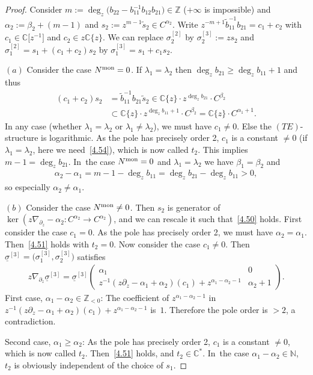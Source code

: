 \documentclass[10pt,a4paper]{amsart}
\numberwithin{equation}{section}
\numberwithin{figure}{section}
\newcommand{\N}{{\mathbb N}}
\newcommand{\Z}{{\mathbb Z}}
\newcommand{\C}{{\mathbb C}}
\newcommand{\www}{\widetilde}
\newcommand{\uuuu}{\underline}
\newcommand{\paa}{\partial}
\newcommand{\nnn}{\nabla}
\begin{document}
\begin{proof}
Consider $m:=\deg_z\big(b_{22}-b_{11}^{-1}b_{12}b_{21}\big)\in\Z$
($+\infty$ is impossible) and
$\alpha_2:=\beta_2+(m-1)$ and
$s_2:=z^{m-1}\www s_2\in C^{\alpha_2}$.
Write $z^{-m+1}\www b_{11}^{-1}b_{21}=c_1+c_2$
with $c_1\in\C\big[z^{-1}\big]$ and $c_2\in z\C\{z\}$.
We can replace $\sigma_2^{[2]}$ by
$\sigma_2^{[3]}:=zs_2$
and $\sigma_1^{[2]}=s_1+(c_1+c_2)s_2$ by
$\sigma_1^{[3]}=s_1+c_1s_2$.

$(a)$ Consider the case $N^{\rm mon}=0$.
If $\lambda_1=\lambda_2$ then $\deg_z b_{21}\geq \deg_z b_{11}+1$
and thus
\begin{align}
(c_1+c_2)s_2&=\www{b}_{11}^{-1}b_{21}\www{s}_2\in
\C\{z\}\cdot z^{\deg_zb_{21}}\cdot C^{\beta_2}\nonumber
\\
&{}\subset \C\{z\}\cdot z^{\deg_zb_{11}+1}\cdot C^{\beta_2}
= \C\{z\}\cdot C^{\alpha_1+1}.\label{4.54}
\end{align}
In any case (whether $\lambda_1=\lambda_2$ or
$\lambda_1\neq \lambda_2$), we must have $c_1\neq 0$.
Else the $(TE)$-structure is logarithmic.
As the pole has precisely order 2, $c_1$ is a constant
$\neq 0$ (if $\lambda_1=\lambda_2$, here we need~\eqref{4.54}),
which is now called $t_2$. This implies $m-1=\deg_z b_{21}$. In~the case $N^{\rm mon}=0$ and $\lambda_1=\lambda_2$
we have $\beta_1=\beta_2$ and
\begin{gather*}
\alpha_2-\alpha_1=m-1-\deg_z b_{11}
=\deg_z b_{21}-\deg_z b_{11}> 0,%
\end{gather*}
so especially $\alpha_2\neq \alpha_1$.

$(b)$ Consider the case $N^{\rm mon}\neq 0$.
Then $s_2$ is generator of
$\ker(z\nnn_{\paa_z}-\alpha_2\colon C^{\alpha_2}\to C^{\alpha_2})$,
and we can rescale it such that~\eqref{4.50} holds.
First consider the case $c_1=0$.
As the pole has precisely order 2, we must have
$\alpha_2=\alpha_1$. Then~\eqref{4.51} holds with $t_2=0$.
Now consider the case $c_1\neq 0$. Then
$\uuuu{\sigma}^{[3]}=\big(\sigma_1^{[3]},\sigma_2^{[3]}\big)$ satisfies
\begin{gather*}%
z\nnn_{\paa_z}\uuuu{\sigma}^{[3]}=\uuuu{\sigma}^{[3]}
\begin{pmatrix}\alpha_1 & 0 \\
z^{-1}(z\paa_z-\alpha_1+\alpha_2)(c_1)
+z^{\alpha_1-\alpha_2-1}& \alpha_2+1
\end{pmatrix}\!.
\end{gather*}
First case, $\alpha_1-\alpha_2\in\Z_{<0}$:
The coefficient of $z^{\alpha_1-\alpha_2-1}$
in $z^{-1}(z\paa_z-\alpha_1+\alpha_2)(c_1)
+z^{\alpha_1-\alpha_2-1}$ is~$1$.
Therefore the pole order is $>2$, a contradiction.

Second case, $\alpha_1\geq \alpha_2$:
As the pole has precisely order 2, $c_1$ is a constant $\neq 0$,
which is now called $t_2$. Then~\eqref{4.51} holds,
and $t_2\in\C^*$. In~the case $\alpha_1-\alpha_2\in\N$,
$t_2$ is obviously independent of the choice of $s_1$.
\end{proof}
\end{document}
